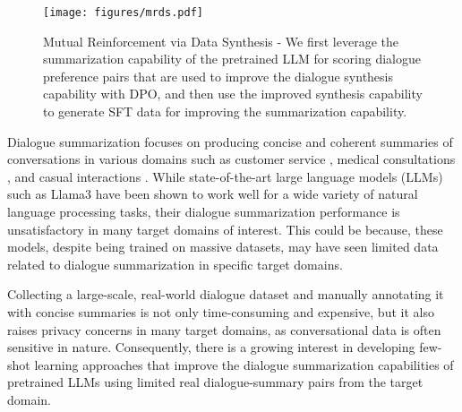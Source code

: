 
\begin{figure}[t]
    \centering
    \texttt{[image: figures/mrds.pdf]}
    \caption{Mutual Reinforcement via Data Synthesis - We first leverage the summarization capability of the pretrained LLM for scoring dialogue preference pairs that are used to improve the dialogue synthesis capability with DPO, and then use the improved synthesis capability to generate SFT data for improving the summarization capability.}
    \label{fig:align}
    \vspace{-15pt}
\end{figure}

Dialogue summarization focuses on producing concise and coherent summaries of conversations in various domains such as customer service \citep{feigenblat-etal-2021-tweetsumm-dialog, zhao2021todsum}, medical consultations \citep{chintagunta-etal-2021-medically, jain2022survey, zeng-etal-2020-meddialog}, and casual interactions \citep{chen2021dialogsum,gliwa-etal-2019-samsum}. 
While state-of-the-art large language models (LLMs) such as Llama3 \citep{dubey2024llama} %
have been shown to work well for a wide variety of natural language processing tasks, their dialogue summarization performance is unsatisfactory in many target domains of interest. This could be because, these models, despite being trained on massive datasets, may have seen limited data related to dialogue summarization in specific target domains. 

Collecting a large-scale, real-world dialogue dataset and manually annotating it with concise summaries is not only time-consuming and expensive, but it also raises privacy concerns in many target domains, as conversational data is often sensitive in nature. 
Consequently, there is a growing interest in developing few-shot learning approaches that improve the dialogue summarization capabilities of pretrained LLMs using limited real dialogue-summary pairs from the target domain.


